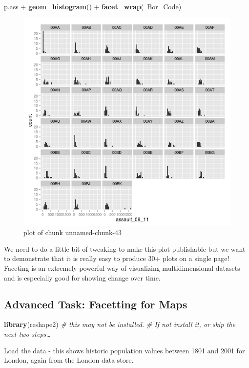 \documentclass[]{article}
\makeatletter
\newenvironment{Shaded}{}{}
\newcommand{\KeywordTok}[1]{\textcolor[rgb]{0.00,0.44,0.13}{\textbf{{#1}}}}
\newcommand{\CommentTok}[1]{\textcolor[rgb]{0.38,0.63,0.69}{\textit{{#1}}}}
\newcommand{\NormalTok}[1]{{#1}}
\def\maxwidth{\ifdim\Gin@nat@width>\linewidth\linewidth
\else\Gin@nat@width\fi}
\let\Oldincludegraphics\includegraphics
\renewcommand{\includegraphics}[1]{\Oldincludegraphics[width=\maxwidth]{#1}}
\makeatother
\begin{document}
\begin{Shaded}
\begin{Highlighting}[]
\NormalTok{p.ass + }\KeywordTok{geom_histogram}\NormalTok{() + }\KeywordTok{facet_wrap}\NormalTok{(~Bor_Code)}
\end{Highlighting}
\end{Shaded}
\begin{figure}[htbp]
\centering
\includegraphics{figure/unnamed-chunk-43.png}
\caption{plot of chunk unnamed-chunk-43}
\end{figure}

We need to do a little bit of tweaking to make this plot publishable but
we want to demonstrate that it is really easy to produce 30+ plots on a
single page! Faceting is an extremely powerful way of visualizing
multidimensional datasets and is especially good for showing change over
time.

\subsection{Advanced Task: Facetting for Maps}

\begin{Shaded}
\begin{Highlighting}[]
\KeywordTok{library}\NormalTok{(reshape2)  }\CommentTok{# this may not be installed. }
\CommentTok{# If not install it, or skip the next two steps…}
\end{Highlighting}
\end{Shaded}
Load the data - this shows historic population values between 1801 and
2001 for London, again from the London data store.
\end{document}
